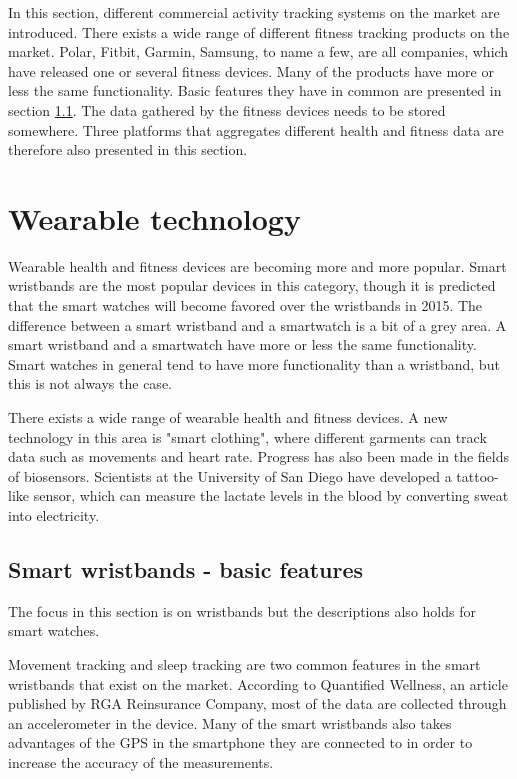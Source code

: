 \documentclass{cslthse-msc}
\begin{document}
In this section, different commercial activity tracking systems on the market are introduced. There exists a wide range of different fitness tracking products on the market. Polar, Fitbit, Garmin, Samsung, to name a few, are all companies, which have released one or several fitness devices. Many of the products have more or less the same functionality. Basic features they have in common are presented in section \ref{sec:Wearable}. The data gathered by the fitness devices needs to be stored somewhere. Three platforms that aggregates different health and fitness data are therefore also presented in this section.

\section{Wearable technology}

Wearable health and fitness devices are becoming more and more popular. Smart wristbands are the most popular devices  in this category, though it is predicted that the smart watches will become favored over the wristbands in 2015\cite{gartner}. The difference between a smart wristband and a smartwatch is a bit of a grey area. A smart wristband and a smartwatch have more or less the same functionality. Smart watches in general tend to have more functionality than a wristband, but this is not always the case. 

There exists a wide range of wearable health and fitness devices. A new technology in this area is "smart clothing", where different garments can track data such as movements and heart rate\cite{callaway2015quantified}. Progress has also been made in the fields of biosensors. Scientists at the University of San Diego have developed a tattoo-like sensor, which can measure the lactate levels in the blood by converting sweat into electricity\cite{tattoo-device}.



\subsection{Smart wristbands - basic features}
\label{sec:Wearable}
The focus in this section is on wristbands but the descriptions also holds for smart watches.

Movement tracking and sleep tracking are two common features in the smart wristbands that exist on the market. According to Quantified Wellness, an article published by RGA Reinsurance Company\cite{callaway2015quantified}, most of the data are collected through an accelerometer in the device. Many of the smart wristbands also takes advantages of the GPS in the smartphone they are connected to in order to increase the accuracy of the measurements.
\end{document}
